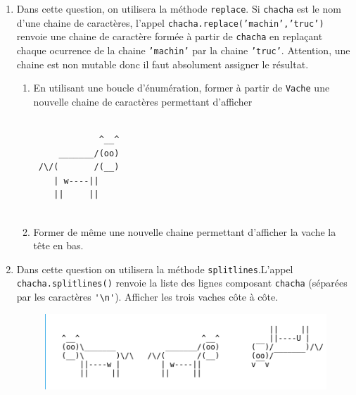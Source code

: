 \begin{enumerate}
\begin{enumerate}
 \item En utilisant \texttt{lili.append(truc)} pour insérer \texttt{truc} à la fin de la liste \texttt{lili} ainsi que \texttt{in} dans un test, former la liste de tous les numéros distincts des caractères qui forment \texttt{Vache}. En examinant la suite des caractères de \texttt{Vache}, Que pensez vous de celui de numéro 10? Est-il égal à la chaine de caractère \verb|'\n'|?
\end{enumerate}
\item Dans cette question, on utilisera la méthode \texttt{replace}. Si \texttt{chacha} est le nom d'une chaine de caractères, l'appel \texttt{chacha.replace('machin','truc')} renvoie une chaine de caractère formée à partir de \texttt{chacha} en replaçant chaque ocurrence de la chaine \texttt{'machin'} par la chaine \texttt{'truc'}. Attention, une chaine est non mutable donc il faut absolument assigner le résultat.
\begin{enumerate}
 \item En utilisant une boucle d'énumération, former à partir de \texttt{Vache} une nouvelle chaine de caractères permettant d'afficher
\begin{verbatim}
  
             ^__^   
     _______/(oo)   
 /\/(       /(__)   
    | w----||       
    ||     ||       
   
\end{verbatim}
\item Former de même une nouvelle chaine permettant d'afficher la vache la tête en bas. 
\end{enumerate}
\item Dans cette question on utilisera la méthode \texttt{splitlines}.\newline L'appel \texttt{chacha.splitlines()} renvoie la liste des lignes composant \texttt{chacha} (séparées par les caractères \verb|'\n'|). Afficher les trois vaches côte à côte.
\begin{figure}[h]
 \centering
 \includegraphics{./Evachscii_1.png}
\end{figure}

\end{enumerate}
